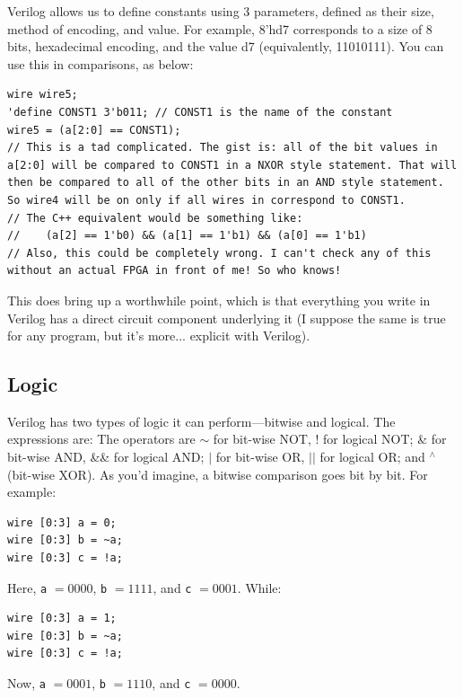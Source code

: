 Verilog allows us to define constants using 3 parameters, defined as their size, method of encoding, and value. For example, 8'hd7 corresponds to a size of 8 bits, hexadecimal encoding, and the value d7 (equivalently, 11010111). You can use this in  comparisons, as below: 

\bs 
\begin{lstlisting}
wire wire5; 
'define CONST1 3'b011; // CONST1 is the name of the constant
wire5 = (a[2:0] == CONST1);
// This is a tad complicated. The gist is: all of the bit values in a[2:0] will be compared to CONST1 in a NXOR style statement. That will then be compared to all of the other bits in an AND style statement. So wire4 will be on only if all wires in correspond to CONST1. 
// The C++ equivalent would be something like: 
//    (a[2] == 1'b0) && (a[1] == 1'b1) && (a[0] == 1'b1)
// Also, this could be completely wrong. I can't check any of this without an actual FPGA in front of me! So who knows!
\end{lstlisting}
\bs

This does bring up a worthwhile point, which is that everything you write in Verilog has a direct circuit component underlying it (I suppose the same is true for any program, but it's more... explicit with Verilog). 


\subsection{Logic}

Verilog has two types of logic it can perform---bitwise and logical. The expressions are: The operators are $\sim$ for bit-wise NOT, ! for logical NOT; \& for bit-wise
AND, \&\& for logical AND; $|$ for bit-wise OR, $||$ for logical OR; and ${}^\wedge$ (bit-wise XOR). As you'd imagine, a bitwise comparison goes bit by bit. For example: 

\bs 
\begin{lstlisting}
wire [0:3] a = 0; 
wire [0:3] b = ~a; 
wire [0:3] c = !a; 
\end{lstlisting}
\bs

Here, \texttt{a} $= 0000$, \texttt{b} $= 1111$, and \texttt{c} $= 0001$. While: 


\bs 
\begin{lstlisting}
wire [0:3] a = 1; 
wire [0:3] b = ~a; 
wire [0:3] c = !a; 
\end{lstlisting}
\bs

Now, \texttt{a} $= 0001$, \texttt{b} $= 1110$, and \texttt{c} $= 0000$. 


